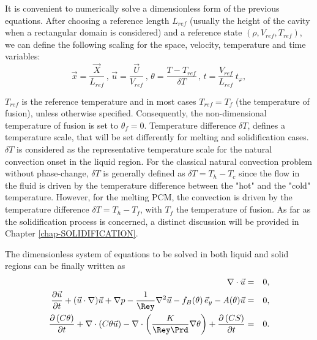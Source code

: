 It is convenient to numerically solve a dimensionless form of the previous equations.
After choosing a reference length $L_{ref}$ (usually the height of the cavity when a rectangular domain is considered) and a reference state $(\rho, V_{ref}, T_{ref})$, we can define the following scaling for the space, velocity, temperature and time variables:
\begin{equation}\label{eq-adim}
\vec{x} = \frac{\vec{X}}{L_{ref}} \, , \,  \vec{u} = \frac{\vec{U}}{V_{ref}} \, , \,  \theta = \frac{T-T_{ref}}{\delta T} \, , \,  t = \frac{V_{ref}}{L_{ref}} \, t_{\varphi},
\end{equation}

\noindent $T_{ref}$ is the reference temperature and in most cases $T_{ref} = T_f$ (the temperature of fusion), unless otherwise specified.
Consequently, the non-dimensional temperature of fusion is set to $\theta_f = 0$.
Temperature difference  $\delta T$, defines a temperature scale, that will be set differently for melting and solidification cases.
$\delta T$ is considered as the representative temperature scale  for the natural convection onset in the liquid region. 
For the classical natural convection problem without phase-change, $\delta T$ is generally defined as $\delta T=T_{h}-T_{c}$ since the flow in the fluid is driven by the temperature difference between the "hot" and the "cold" temperature.
However, for the melting PCM, the convection is driven by the temperature difference $\delta T=T_{h}-T_{f}$, with $T_f$ the temperature of fusion.
As far as the solidification process is concerned, a distinct discussion will be provided in Chapter \ref{chap-SOLIDIFICATION}. 

The dimensionless system of equations to be solved in both liquid and solid regions can be finally written as
\begin{eqnarray}
\nabla\cdot \vec{u}&=&0, \label{eq-qmvt} \\ \vspace{0.2cm}
 \frac{\partial \vec{u}}{\partial t} + {(\vec{u}\cdot\nabla) \vec{u}} +\nabla p -\frac{1}{\Rey}{\nabla^2 \vec{u}} 
 - f_B(\theta)\, \vec{e}_y - A(\theta) \vec{u}&=&0, \label{eq-qmvt-2} \\ \vspace{0.2cm}
 \frac{\partial \left(C \theta\right)}{\partial t} + \nabla \cdot\left( C \theta \vec{u}\right) -
 \nabla \cdot\left( \frac{K}{\Rey \Prd} \nabla \theta \right) +  \frac{\partial \left(C S\right)}{\partial t}  &=& 0. \label{eq-energ} 
\end{eqnarray}

